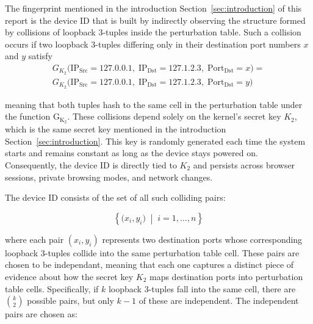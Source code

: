 \documentclass[twocolumn]{report}
\begin{document}
The fingerprint mentioned in the introduction Section~\ref{sec:introduction} of this report is the \alert{device ID} that is built by indirectly observing the structure formed by \alert{collisions of loopback 3-tuples} inside the perturbation table. Such a collision occurs if two loopback 3-tuples differing only in their destination port numbers $x$ and $y$ satisfy
\begin{equation*}
	\begin{split}
		G_{K_{2}}\bigl(
		\mathrm{IP}_{\mathrm{Src}} = 127.0.0.1,\;
		\mathrm{IP}_{\mathrm{Dst}} = 127.1.2.3,\;
		\mathrm{Port}_{\mathrm{Dst}} = x
		\bigr)
		= \\
		G_{K_{2}}\bigl(
		\mathrm{IP}_{\mathrm{Src}} = 127.0.0.1,\;
		\mathrm{IP}_{\mathrm{Dst}} = 127.1.2.3,\;
		\mathrm{Port}_{\mathrm{Dst}} = y
		\bigr)
	\end{split}
\end{equation*}
\vspace{-0.5cm}

meaning that both tuples hash to the same cell in the perturbation table under the function $\mathrm{G_{K_2}}$. These collisions depend solely on the kernel’s \alert{secret key} $K_2$, which is the same secret key mentioned in the introduction Section~\ref{sec:introduction}. This key is randomly generated each time the \alert{system starts} and remains constant as long as the device stays powered on. Consequently, the device ID is directly tied to $K_2$ and persists across browser sessions, private browsing modes, and network changes.

The device ID consists of the set of all such colliding pairs:

\vspace{-0.2cm}
\begin{minipage}{\columnwidth}
\[
	\left\{ \bigl(x_i, y_i\bigr) \;\middle|\; i = 1, \ldots, n \right\}
\]
\end{minipage}

where each pair $(x_i, y_i)$ represents \alert{two destination ports} whose corresponding loopback 3-tuples collide into the same perturbation table cell. These pairs are chosen to be \alert{\hypertarget{independant}{independant}}, meaning that each one captures a distinct piece of evidence about how the secret key $K_2$ maps destination ports into perturbation table cells. Specifically, if $k$ loopback 3-tuples fall into the same cell, there are $\binom{k}{2}$ possible pairs, but only $k-1$ of these are independent. The independent pairs are chosen as:
\end{document}
